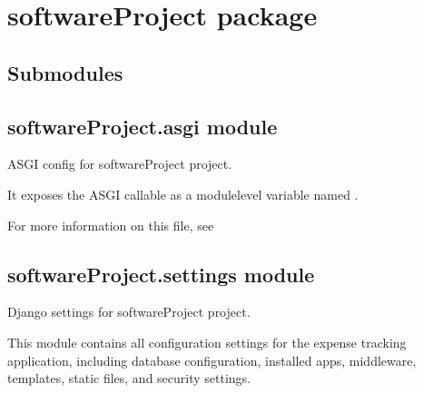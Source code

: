 \documentclass[letterpaper,10pt,english]{sphinxmanual}
\begin{document}
\section{softwareProject package}
\label{\detokenize{softwareProject:softwareproject-package}}\label{\detokenize{softwareProject::doc}}

\subsection{Submodules}
\label{\detokenize{softwareProject:submodules}}

\subsection{softwareProject.asgi module}
\label{\detokenize{softwareProject:module-softwareProject.asgi}}\label{\detokenize{softwareProject:softwareproject-asgi-module}}
\sphinxAtStartPar
ASGI config for softwareProject project.

\sphinxAtStartPar
It exposes the ASGI callable as a module\sphinxhyphen{}level variable named .

\sphinxAtStartPar
For more information on this file, see


\subsection{softwareProject.settings module}
\label{\detokenize{softwareProject:module-softwareProject.settings}}\label{\detokenize{softwareProject:softwareproject-settings-module}}
\sphinxAtStartPar
Django settings for softwareProject project.

\sphinxAtStartPar
This module contains all configuration settings for the expense tracking
application, including database configuration, installed apps, middleware,
templates, static files, and security settings.
\end{document}
